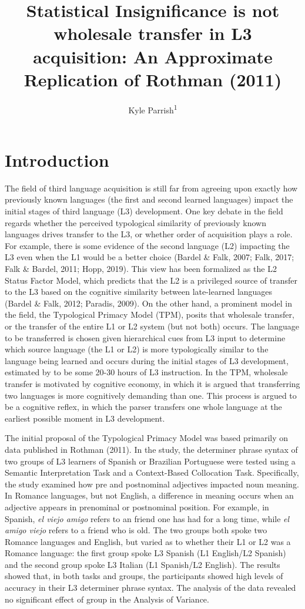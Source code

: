 \documentclass[
  man,floatsintext]{apa6}
\title{Statistical Insignificance is not wholesale transfer in L3 acquisition: An Approximate Replication of Rothman (2011)}
\author{Kyle Parrish\textsuperscript{1}}
\date{}
\affiliation{\vspace{0.5cm}\textsuperscript{1} Rutgers University}
\begin{document}
\maketitle

\hypertarget{introduction}{%
\section{Introduction}\label{introduction}}

The field of third language acquisition is still far from agreeing upon exactly how previously known languages (the first and second learned languages) impact the initial stages of third language (L3) development.
One key debate in the field regards whether the perceived typological similarity of previously known languages drives transfer to the L3, or whether order of acquisition plays a role.
For example, there is some evidence of the second language (L2) impacting the L3 even when the L1 would be a better choice (Bardel \& Falk, 2007; Falk, 2017; Falk \& Bardel, 2011; Hopp, 2019).
This view has been formalized as the L2 Status Factor Model, which predicts that the L2 is a privileged source of transfer to the L3 based on the cognitive similarity between late-learned languages (Bardel \& Falk, 2012; Paradis, 2009).
On the other hand, a prominent model in the field, the Typological Primacy Model (TPM), posits that wholesale transfer, or the transfer of the entire L1 or L2 system (but not both) occurs.
The language to be transferred is chosen given hierarchical cues from L3 input to determine which source language (the L1 or L2) is more typologically similar to the language being learned and occurs during the initial stages of L3 development, estimated by to be some 20-30 hours of L3 instruction.
In the TPM, wholesale transfer is motivated by cognitive economy, in which it is argued that transferring two languages is more cognitively demanding than one.
This process is argued to be a cognitive reflex, in which the parser transfers one whole language at the earliest possible moment in L3 development.

The initial proposal of the Typological Primacy Model was based primarily on data published in Rothman (2011).
In the study, the determiner phrase syntax of two groups of L3 learners of Spanish or Brazilian Portuguese were tested using a Semantic Interpretation Task and a Context-Based Collocation Task.
Specifically, the study examined how pre and postnominal adjectives impacted noun meaning.
In Romance languages, but not English, a difference in meaning occurs when an adjective appears in prenominal or postnominal position.
For example, in Spanish, \emph{el viejo amigo} refers to an friend one has had for a long time, while \emph{el amigo viejo} refers to a friend who is old.
The two groups both spoke two Romance languages and English, but varied as to whether their L1 or L2 was a Romance language: the first group spoke L3 Spanish (L1 English/L2 Spanish) and the second group spoke L3 Italian (L1 Spanish/L2 English).
The results showed that, in both tasks and groups, the participants showed high levels of accuracy in their L3 determiner phrase syntax.
The analysis of the data revealed no significant effect of group in the Analysis of Variance.
\end{document}
